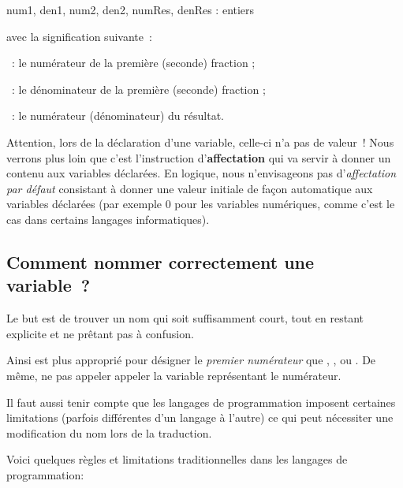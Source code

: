 			\begin{Pseudocode}
				\Decl num1, den1, num2, den2, numRes, denRes : entiers
			\end{Pseudocode}

			avec la signification suivante~:

			\begin{liste}
			\item
				~: 
					le numérateur de la première (seconde) fraction ;
			\item
				~: 
					le dénominateur de la première (seconde) fraction ;
			\item
				~: 
					le numérateur (dénominateur) du résultat.
			\end{liste}
			
			Attention, lors de la déclaration d’une variable, celle-ci n’a pas de
			valeur~! Nous verrons plus loin que c’est l’instruction
			d’\textbf{affectation} qui va servir à donner un contenu aux variables
			déclarées. En logique, nous n’envisageons pas d’\textit{affectation par
			défaut} consistant à donner une valeur initiale de façon automatique
			aux variables déclarées (par exemple 0 pour les variables numériques,
			comme c’est le cas dans certains langages informatiques).

		\subsection{Comment nommer correctement une variable~?}

			Le but est de trouver un nom qui soit suffisamment court,
			tout en restant explicite et ne prêtant pas à confusion.
			
			Ainsi  est plus approprié pour
			désigner le \textit{premier numérateur} que 
			, , 
			ou .
			De même, ne pas appeler appeler  
			la variable représentant le numérateur.
			
			Il faut aussi tenir compte que les
			langages de programmation imposent certaines limitations 
			(parfois différentes d’un langage à l’autre)
			ce qui peut nécessiter une modification du nom lors de la traduction.

			Voici quelques règles et limitations traditionnelles dans les langages
			de programmation:

